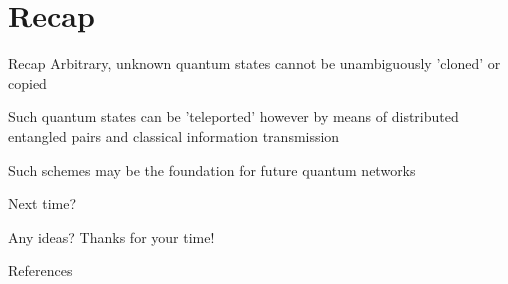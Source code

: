 \documentclass[11pt]{beamer}
\begin{document}
\section*{Recap}
\begin{frame}{Recap}
Arbitrary, unknown quantum states cannot be unambiguously 'cloned' or copied

\vspace{.5cm}\pause

Such quantum states can be 'teleported' however by means of distributed entangled pairs and classical information transmission

\vspace{.5cm}\pause

Such schemes may be the foundation for future quantum networks
\end{frame}

\begin{frame}{Next time?}

\begin{center}
Any ideas? \pause Thanks for your time!
\end{center}

\end{frame}

\begin{frame}[allowframebreaks]{References}


 

\end{frame}
\end{document}
